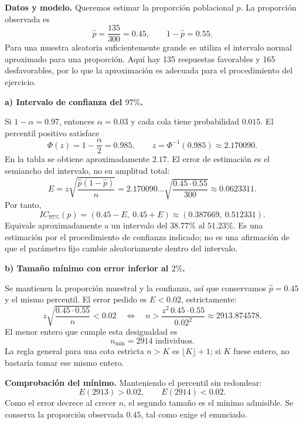 \textbf{Datos y modelo.} Queremos estimar la proporción poblacional $p$. La proporción observada es
\[
\widehat p=\frac{135}{300}=0.45,\qquad 1-\widehat p=0.55.
\]
Para una muestra aleatoria suficientemente grande se utiliza el intervalo normal aproximado para una proporción. Aquí hay 135 respuestas favorables y 165 desfavorables, por lo que la aproximación es adecuada para el procedimiento del ejercicio.

\textbf{a) Intervalo de confianza del $97\%$.}\par\nopagebreak[4]

Si $1-\alpha=0.97$, entonces $\alpha=0.03$ y cada cola tiene probabilidad $0.015$. El percentil positivo satisface
\[
\Phi(z)=1-\frac\alpha2=0.985,
\qquad z=\Phi^{-1}(0.985)\approx2.170090.
\]
En la tabla se obtiene aproximadamente $2.17$. El error de estimación es el semiancho del intervalo, no su amplitud total:
\[
E=z\sqrt{\frac{\widehat p(1-\widehat p)}{n}}
=2.170090\ldots\sqrt{\frac{0.45\cdot0.55}{300}}
\approx0.0623311.
\]
Por tanto,
\[
IC_{97\%}(p)=\left(0.45-E,\ 0.45+E\right)
\approx\boxed{(0.387669,\ 0.512331)}.
\]
Equivale aproximadamente a un intervalo del $38.77\%$ al $51.23\%$. Es una estimación por el procedimiento de confianza indicado; no es una afirmación de que el parámetro fijo cambie aleatoriamente dentro del intervalo.

\textbf{b) Tamaño mínimo con error inferior al $2\%$.}\par\nopagebreak[4]

Se mantienen la proporción muestral y la confianza, así que conservamos $\widehat p=0.45$ y el mismo percentil. El error pedido es $E<0.02$, estrictamente:
\[
z\sqrt{\frac{0.45\cdot0.55}{n}}<0.02
\quad\Longleftrightarrow\quad
n>\frac{z^2\,0.45\cdot0.55}{0.02^2}
\approx2913.874578.
\]
El menor entero que cumple esta desigualdad es
\[
\boxed{n_{\min}=2914\text{ individuos}.}
\]
La regla general para una cota estricta $n>K$ es $\lfloor K\rfloor+1$; si $K$ fuese entero, no bastaría tomar ese mismo entero.

\textbf{Comprobación del mínimo.} Manteniendo el percentil sin redondear:
\[
E(2913)>0.02,\qquad E(2914)<0.02.
\]
Como el error decrece al crecer $n$, el segundo tamaño es el mínimo admisible. Se conserva la proporción observada $0.45$, tal como exige el enunciado.
